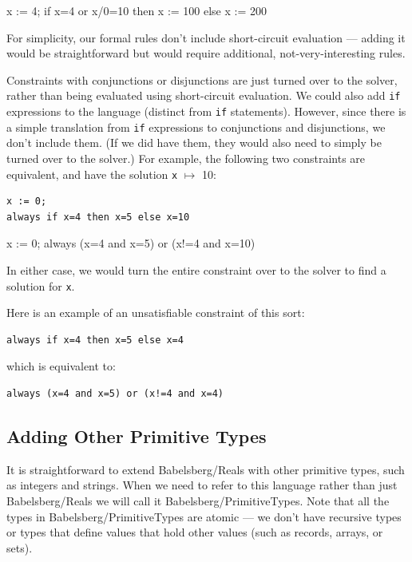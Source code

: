 \documentclass{article}
\begin{document}
\begin{example}
x := 4;
if x=4 or x/0=10
  then x := 100
  else x := 200
\end{example}

For simplicity, our formal rules don't include short-circuit
evaluation --- adding it would be straightforward but would require
additional, not-very-interesting rules.

Constraints with conjunctions or disjunctions are
just turned over to the solver, rather than being evaluated using
short-circuit evaluation.  We could also add \verb|if| expressions to
the language (distinct from \verb|if| statements).  However, since
there is a simple translation from \verb|if| expressions to
conjunctions and disjunctions, we don't include them.  (If we did have
them, they would also need to simply be turned over to the solver.)
For example, the following two constraints are equivalent, and have 
the solution \verb|x| $\mapsto$ 10:

\begin{verbatim}
x := 0;
always if x=4 then x=5 else x=10
\end{verbatim}

\begin{example}
x := 0;
always (x=4 and x=5) or (x!=4 and x=10)
\end{example}

In either case, we would turn the entire constraint over to the solver
to find a solution for \verb|x|.

Here is an example of an unsatisfiable constraint of this sort:
\begin{verbatim}
always if x=4 then x=5 else x=4
\end{verbatim}
which is equivalent to:
\begin{verbatim}
always (x=4 and x=5) or (x!=4 and x=4)
\end{verbatim}

\subsection{Adding Other Primitive Types}

It is straightforward to extend Babelsberg/Reals with other primitive
types, such as integers and strings.  When we need to refer to
this language rather than just Babelsberg/Reals we will call it
Babelsberg/PrimitiveTypes.  Note that all the types in
Babelsberg/PrimitiveTypes are atomic --- we don't have recursive types
or types that define values that hold other values (such as records,
arrays, or sets). 
\end{document}
